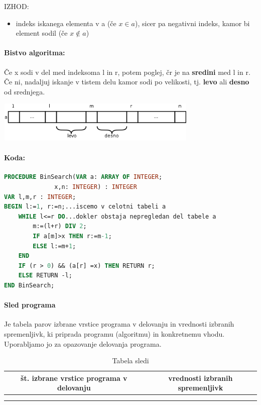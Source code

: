\documentclass[a4paper,10pt]{article}
\begin{document}
\begin{flushleft}
IZHOD:
\end{flushleft}

\begin{itemize}
\item indeks iskanega elementa v a (\v ce $x \in a$), sicer pa negativni indeks, kamor bi element sodil (\v ce $x \notin a$)
\end{itemize}

\paragraph{Bistvo algoritma:}
\v Ce x sodi v del med indeksoma l in r, potem poglej, \v cr je na \textbf{sredini} med l in r. \v Ce ni, nadaljuj iskanje v tistem delu kamor sodi po velikosti, tj. \textbf{levo} ali \textbf{desno} od srednjega.
	\begin{center}
	\includegraphics[width=9.65cm,height=1.95cm]{Slike/BinarniSortTabela.png}
	\end{center}

\paragraph{Koda:}
\begin{flushleft}
\begin{lstlisting}[language=Pascal,caption={Koda za metodo binarnega iskanja}]
PROCEDURE BinSearch(VAR a: ARRAY OF INTEGER;
		      x,n: INTEGER) : INTEGER
VAR l,m,r : INTEGER;
BEGIN l:=1, r:=n;...iscemo v celotni tabeli a
	WHILE l<=r DO...dokler obstaja nepregledan del tabele a
		m:=(l+r) DIV 2;
		IF a[m]>x THEN r:=m-1;
		ELSE l:=m+1;
	END
	IF (r > 0) && (a[r] =x) THEN RETURN r;
	ELSE RETURN -l;
END BinSearch;
\end{lstlisting}
\end{flushleft}

\paragraph{Sled programa}
Je tabela parov izbrane vrstice programa v delovanju in vrednosti izbranih spremenljivk, ki priprada programu (algoritmu) in konkretnemu vhodu. Uporabljamo jo za opazovanje delovanja programa.
\begin{table}[h]
\centering
\begin{tabular}{|c|c|}\hline
\v st. izbrane vrstice programa v delovanju & vrednosti izbranih spremenljivk \\\hline
 & \\
 &
\end{tabular} 
\caption{Tabela sledi}
\end{table}
\end{document}
